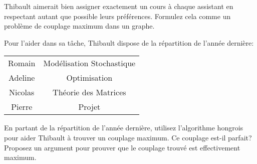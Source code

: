 Thibault aimerait bien assigner exactement un cours à chaque assistant en respectant autant que possible leurs préférences. Formulez cela comme un problème de couplage maximum dans un graphe.

Pour l'aider dans sa tâche, Thibault dispose de la répartition de l'année dernière:

\begin{center}
  \begin{tabular}{|c|c|}
    \hline
    Romain & Modélisation Stochastique \\
    Adeline & Optimisation \\
    Nicolas & Théorie des Matrices \\
    Pierre & Projet \\
    \hline
  \end{tabular}
\end{center}

En partant de la répartition de l'année dernière, utilisez l'algorithme hongrois pour aider Thibault à trouver un couplage maximum. Ce couplage est-il parfait? Proposez un argument pour prouver que le couplage trouvé est effectivement maximum.



%
%
%
%
%
%
%
%


